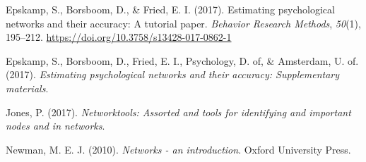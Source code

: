 \documentclass[
]{article}
\begin{document}
\leavevmode\hypertarget{ref-Epskamp2017}{}%
Epskamp, S., Borsboom, D., \& Fried, E. I. (2017). Estimating
psychological networks and their accuracy: A tutorial paper.
\emph{Behavior Research Methods}, \emph{50}(1), 195--212.
\url{https://doi.org/10.3758/s13428-017-0862-1}

\leavevmode\hypertarget{ref-Epskamp2017a}{}%
Epskamp, S., Borsboom, D., Fried, E. I., Psychology, D. of, \&
Amsterdam, U. of. (2017). \emph{Estimating psychological networks and
their accuracy: Supplementary materials}.

\leavevmode\hypertarget{ref-Jones2017}{}%
Jones, P. (2017). \emph{Networktools: Assorted and tools for identifying
and important nodes and in networks}.

\leavevmode\hypertarget{ref-Newman2010}{}%
Newman, M. E. J. (2010). \emph{Networks - an introduction}. Oxford
University Press.
\end{document}
